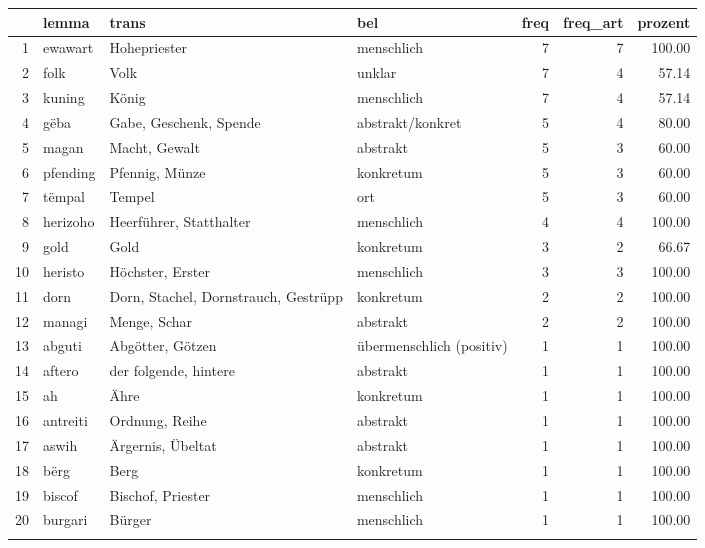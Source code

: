 \begin{tabular}{rlllrrr}
  \lsptoprule
 & lemma & trans & bel & freq & freq\_art & prozent \\ 
  \midrule
1 & ewawart & Hohepriester & menschlich &   7 &   7 & 100.00 \\ 
  2 & folk & Volk & unklar &   7 &   4 & 57.14 \\ 
  3 & kuning & König & menschlich &   7 &   4 & 57.14 \\ 
  4 & gëba & Gabe, Geschenk, Spende & abstrakt/konkret &   5 &   4 & 80.00 \\ 
  5 & magan & Macht, Gewalt & abstrakt &   5 &   3 & 60.00 \\ 
  6 & pfending & Pfennig, Münze & konkretum &   5 &   3 & 60.00 \\ 
  7 & tëmpal & Tempel & ort &   5 &   3 & 60.00 \\ 
  8 & herizoho & Heerführer, Statthalter & menschlich &   4 &   4 & 100.00 \\ 
  9 & gold & Gold & konkretum &   3 &   2 & 66.67 \\ 
  10 & heristo & Höchster, Erster & menschlich &   3 &   3 & 100.00 \\ 
  11 & dorn & Dorn, Stachel, Dornstrauch, Gestrüpp & konkretum &   2 &   2 & 100.00 \\ 
  12 & managi & Menge, Schar & abstrakt &   2 &   2 & 100.00 \\ 
  13 & abguti & Abgötter, Götzen & übermenschlich (positiv) &   1 &   1 & 100.00 \\ 
  14 & aftero & der folgende, hintere & abstrakt &   1 &   1 & 100.00 \\ 
  15 & ah & Ähre & konkretum &   1 &   1 & 100.00 \\ 
  16 & antreiti & Ordnung, Reihe & abstrakt &   1 &   1 & 100.00 \\ 
  17 & aswih & Ärgernis, Übeltat & abstrakt &   1 &   1 & 100.00 \\ 
  18 & bërg & Berg & konkretum &   1 &   1 & 100.00 \\ 
  19 & biscof & Bischof, Priester & menschlich &   1 &   1 & 100.00 \\ 
  20 & burgari & Bürger & menschlich &   1 &   1 & 100.00 \\ 
   \lspbottomrule
\end{tabular}
